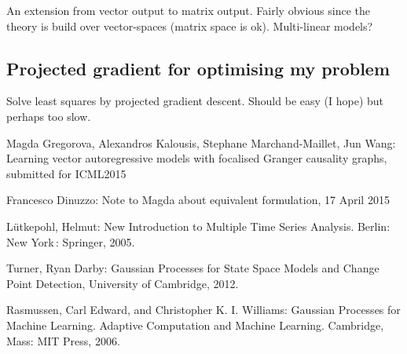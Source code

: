 \documentclass[a4paper]{article}
\begin{document}
An extension from vector output to matrix output. Fairly obvious since the theory is build over vector-spaces (matrix space is ok). Multi-linear models?

\subsection{Projected gradient for optimising my problem}

Solve least squares by projected gradient descent. Should be easy (I hope) but perhaps too slow.




\begin{thebibliography}{9}

  Magda Gregorova, Alexandros Kalousis, Stephane Marchand-Maillet, Jun Wang:
  Learning vector autoregressive models with focalised Granger causality graphs,
  submitted for ICML2015

  Francesco Dinuzzo: Note to Magda about equivalent formulation, 
  17 April 2015
  
	L\"utkepohl, Helmut: New Introduction to Multiple Time Series Analysis.
	Berlin: New York : Springer, 2005.
	
Turner, Ryan Darby: Gaussian Processes for State Space Models and Change Point Detection, University of Cambridge, 2012. 

Rasmussen, Carl Edward, and Christopher K. I. Williams: Gaussian Processes for Machine Learning. Adaptive Computation and Machine Learning. Cambridge, Mass: MIT Press, 2006.




\end{thebibliography}
\end{document}
